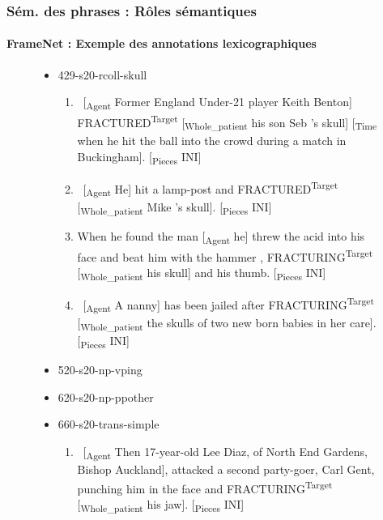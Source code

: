 \documentclass[xcolor=table]{beamer}
\begin{document}
\begin{frame}
	\frametitle{Sém. des phrases : Rôles sémantiques}
	\framesubtitle{FrameNet : Exemple des annotations lexicographiques}
	
	\vspace{-6pt}
	\begin{figure}
		\tiny\bfseries
		\begin{tcolorbox}[colback=white, colframe=blue, boxrule=1pt, text width=.91\textwidth]
			\vspace{-6pt}
		\begin{itemize}
			\item 429-s20-rcoll-skull
			\begin{enumerate}\tiny
				\item \ [\textsubscript{\color{red}Agent} Former England Under-21 player Keith Benton] FRACTURED\textsuperscript{\color{red}Target} [\textsubscript{\color{red}Whole\_patient} his son Seb 's skull] [\textsubscript{\color{red}Time} when he hit the ball into the crowd during a match in Buckingham]. [\textsubscript{\color{red}Pieces} INI] 
				\item \ [\textsubscript{\color{red}Agent} He] hit a lamp-post and FRACTURED\textsuperscript{\color{red}Target} [\textsubscript{\color{red}Whole\_patient} Mike 's skull]. [\textsubscript{\color{red}Pieces} INI] 
				\item When he found the man [\textsubscript{\color{red}Agent} he] threw the acid into his face and beat him with the hammer , FRACTURING\textsuperscript{\color{red}Target} [\textsubscript{\color{red}Whole\_patient} his skull] and his thumb. [\textsubscript{\color{red}Pieces} INI] 
				\item \ [\textsubscript{\color{red}Agent} A nanny] has been jailed after FRACTURING\textsuperscript{\color{red}Target} [\textsubscript{\color{red}Whole\_patient} the skulls of two new born babies in her care]. [\textsubscript{\color{red}Pieces} INI] 
			\end{enumerate}
			\item 520-s20-np-vping
			\item 620-s20-np-ppother
			\item 660-s20-trans-simple
			\begin{enumerate}\tiny
				\item \ [\textsubscript{\color{red}Agent} Then 17-year-old Lee Diaz, of North End Gardens, Bishop Auckland], attacked a second party-goer, Carl Gent, punching him in the face and FRACTURING\textsuperscript{\color{red}Target} [\textsubscript{\color{red}Whole\_patient} his jaw]. [\textsubscript{\color{red}Pieces} INI] 
			\end{enumerate}
			

\end{itemize}
\end{tcolorbox}
\end{figure}
\end{frame}
\end{document}
